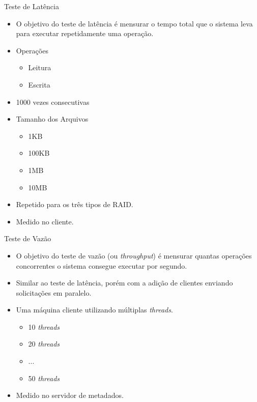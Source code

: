 \begin{frame}{Teste de Latência}
	\begin{itemize}
		\item O objetivo do teste de latência é mensurar o tempo total que o sistema leva para executar repetidamente uma operação.
		\item Operações
		\begin{itemize}
			\item Leitura
			\item Escrita
		\end{itemize}
		\item 1000 vezes consecutivas
		\item Tamanho dos Arquivos
		\begin{itemize}
			\item 1KB
			\item 100KB
			\item 1MB
			\item 10MB
		\end{itemize}
		\item Repetido para os três tipos de RAID.
		\item Medido no cliente.
	\end{itemize}
\end{frame}

\begin{frame}{Teste de Vazão}
	\begin{itemize}
		\item O objetivo do teste de vazão (ou \textit{throughput}) é mensurar quantas operações concorrentes o sistema consegue executar por segundo.
		\item Similar ao teste de latência, porém com a adição de clientes enviando solicitações em paralelo.
		\item Uma máquina cliente utilizando múltiplas \textit{threads}.
		\begin{itemize}
			\item 10 \textit{threads}
			\item 20 \textit{threads}
			\item ...
			\item 50 \textit{threads}
		\end{itemize}
		\item Medido no servidor de metadados.
	\end{itemize}
\end{frame}

